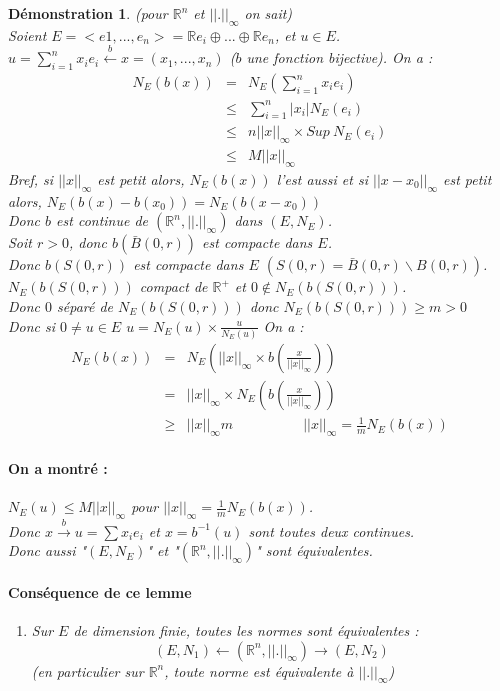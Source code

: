\documentclass[a4paper, oneside]{report}
\theoremstyle{break}
\newtheorem*{demo}{Démonstration}
\newcommand{\x}{\times}
\newcommand{\R}{\mathbb{R}}
\newcommand{\fracun}[1]{\frac{1}{#1}}
\begin{document}
\begin{demo}
(pour $\R^n$ et $||.||_ \infty$ on sait)\\
Soient $E=<e1,...,e_n>=\R e_i \oplus ... \oplus \R e_n$, et $u\in E$.\\
$u = \sum_{i=1}^nx_ie_i \overset{b}{\leftarrow} x=(x_1,...,x_n)$ ($b$ une fonction bijective).
On a :
$$
\begin{array}{lll}
N_E(b(x))&=&N_E(\sum_{i=1}^nx_ie_i)\\
&\leq & \sum_{i=1}^n|x_i|N_E(e_i)\\
&\leq & n ||x||_\infty \x Sup~N_E(e_i)\\
&\leq & M ||x||_\infty
\end{array}$$
Bref, si $||x||_\infty$ est petit alors, $N_E(b(x))$ l'est aussi et si $||x-x_0||_\infty$ est petit alors, $N_E(b(x)-b(x_0)) = N_E(b(x - x_0))$\\
Donc $b$ est continue de $(\R^n, ||.||_\infty)$ dans $(E,N_E)$.\\
Soit $r>0$, donc $b(\bar{B}(0,r))$ est compacte dans $E$.\\
Donc $b(S(0,r))$ est compacte dans $E$ $(S(0,r) = \bar{B}(0,r)\backslash B(0,r))$.\\
$N_E(b(S(0,r)))$ compact de $\R^+$ et $0\notin N_E(b(S(0,r)))$.\\
Donc $0$ séparé de $N_E(b(S(0,r)))$ donc $N_E(b(S(0,r))) \geq m >0$\\
Donc si $0\neq u\in E$ $u=N_E(u)\x \frac{u}{N_E(u)}$
On a :
$$\begin{array}{lll}
N_E(b(x))&=&N_E(||x||_\infty\x b(\frac{x}{||x||_\infty}))\\
&=&||x||_\infty \x N_E(b(\frac{x}{||x||_\infty}))\\
&\geq& ||x||_\infty m\hspace{5em}||x||_\infty = \fracun{m}N_E(b(x))
\end{array}$$

\paragraph{On a montré :} 
$N_E(u) \leq M ||x||_\infty$ pour $||x||_\infty = \fracun{m}N_E(b(x))$.\\
Donc $x\overset{b}{\rightarrow} u= \sum x_ie_i$ et $x = b^{-1}(u)$ sont toutes deux continues.\\
Donc aussi "$(E,N_E)$" et  "$(\R^n,||.||_\infty)$" sont équivalentes.\\

\paragraph{Conséquence de ce lemme}
\begin{enumerate}
\item Sur $E$ de dimension finie, toutes les normes sont équivalentes :
$$(E,N_1) \leftarrow (\R^n, ||.||_\infty) \rightarrow (E,N_2)$$
(en particulier sur $\R^n$, toute norme est équivalente à $||.||_\infty$)


\end{enumerate}
\end{demo}
\end{document}
